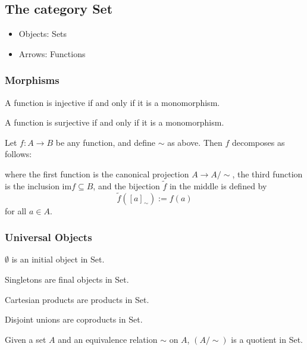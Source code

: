 \subsection{The category Set}
\begin{itemize}
  \item Objects: Sets
  \item Arrows: Functions
\end{itemize}

\subsubsection{Morphisms}

\begin{proposition}
A function is injective if and only if it is a monomorphism.
\end{proposition}

\begin{proposition}
A function is surjective if and only if it is a monomorphism.
\end{proposition}

\begin{theorem}
\label{setfunctioncanonicaldecomposition}
Let $f:A \rightarrow B$ be any function, and define $\sim$ as above. Then $f$ decomposes as follows:

\begin{figure}[H]
  \centering
  
\end{figure}

\noindent where the first function is the canonical projection $A \rightarrow A/\sim$, the third function is the inclusion $\textrm{im}f \subseteq B$, and
the bijection $\tilde f$ in the middle is defined by
$$\tilde f([a]_{\sim}) := f(a)$$
for all $a \in A$.
\end{theorem}

\subsubsection{Universal Objects}

\begin{proposition}
$\emptyset$ is an initial object in Set.
\end{proposition}

\begin{proposition}
Singletons are final objects in Set.
\end{proposition}

\begin{proposition}
Cartesian products are products in Set.
\end{proposition}

\begin{proposition}
Disjoint unions are coproducts in Set.
\end{proposition}

\begin{proposition}
Given a set $A$ and an equivalence relation $\sim$ on $A$, $(A/\sim)$ is a quotient in Set.
\end{proposition}